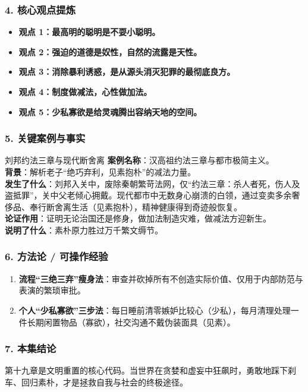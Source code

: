 \subsubsection{4. 核心观点提炼}
\begin{itemize}
    \item \textbf{观点 1：最高明的聪明是不耍小聪明。}
    \item \textbf{观点 2：强迫的道德是奴性，自然的流露是天性。}
    \item \textbf{观点 3：消除暴利诱惑，是从源头消灭犯罪的最彻底良方。}
    \item \textbf{观点 4：制度做减法，心性做加法。}
    \item \textbf{观点 5：少私寡欲是给灵魂腾出容纳天地的空间。}
\end{itemize}

\subsubsection{5. 关键案例与事实}
\begin{CaseBox}{刘邦约法三章与现代断舍离}
\textbf{案例名称}：汉高祖约法三章与都市极简主义。\\
\textbf{背景}：解析老子“绝巧弃利，见素抱朴”的减法力量。\\
\textbf{发生了什么}：刘邦入关中，废除秦朝繁苛法网，仅“约法三章：杀人者死，伤人及盗抵罪”，关中父老倾心拥戴。现代都市中无数身心崩溃的白领，通过变卖多余奢侈品、奉行断舍离生活（见素抱朴），精神健康得到奇迹般恢复。\\
\textbf{论证作用}：证明无论治国还是修身，做加法制造灾难，做减法方迎新生。\\
\textbf{说明了什么}：素朴原力胜过万千繁文缛节。
\end{CaseBox}

\subsubsection{6. 方法论 / 可操作经验}
\begin{enumerate}
    \item \textbf{流程“三绝三弃”瘦身法}：审查并砍掉所有不创造实际价值、仅用于内部防范与表演的繁琐审批。
    \item \textbf{个人“少私寡欲”三步法}：每日睡前清零嫉妒比较心（少私），每月清理处理一件长期闲置物品（寡欲），社交沟通不戴伪装面具（见素）。
\end{enumerate}

\subsubsection{7. 本集结论}
第十九章是文明重置的核心代码。当世界在贪婪和虚妄中狂飙时，勇敢地踩下刹车、回归素朴，才是拯救自我与社会的终极途径。

